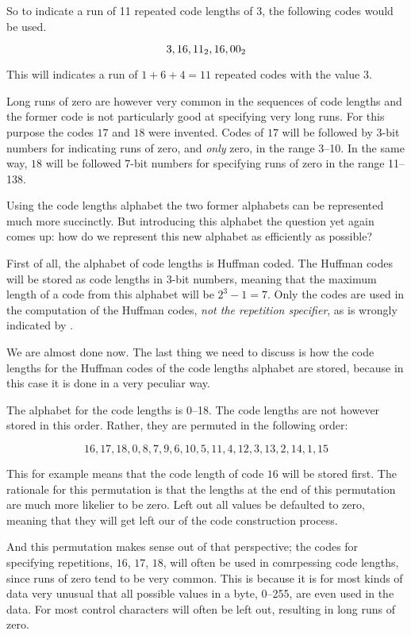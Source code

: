 So to indicate a run of 11 repeated code lengths of $3$, the following
codes would be used.

\begin{equation*}
  3, 16, \mbox{\ensuremath{11_2}}, 16, \mbox{\ensuremath{00_2}}
\end{equation*}

This will indicates a run of $1 + 6 + 4 = 11$ repeated codes with the
value $3$.

Long runs of zero are however very common in the sequences of code
lengths and the former code is not particularly good at specifying
very long runs. For this purpose the codes $17$ and $18$ were
invented. Codes of $17$ will be followed by 3-bit numbers for
indicating runs of zero, and \textit{only} zero, in the range
3--10. In the same way, $18$ will be followed 7-bit numbers for
specifying runs of zero in the range 11--138.

Using the code lengths alphabet the two former alphabets can be
represented much more succinctly. But introducing this alphabet the
question yet again comes up: how do we represent this new alphabet as
efficiently as possible?

First of all, the alphabet of code lengths is Huffman coded. The
Huffman codes will be stored as code lengths in 3-bit numbers, meaning
that the maximum length of a code from this alphabet will be $2^3 - 1
= 7$. Only the codes are used in the computation of the Huffman codes,
\textit{not the repetition specifier}, as is wrongly indicated by
\cite{Salomon:2004:DCC}.

We are almost done now. The last thing we need to discuss is how the
code lengths for the Huffman codes of the code lengths alphabet are
stored, because in this case it is done in a very peculiar way.

The alphabet for the code lengths is 0--18. The code lengths are not
however stored in this order. Rather, they are permuted in the
following order:

\begin{equation*}
  16, 17, 18, 0, 8, 7, 9, 6, 10, 5, 11, 4, 12, 3, 13, 2, 14, 1, 15
\end{equation*}

This for example means that the code length of code $16$ will be
stored first. The rationale for this permutation is that the lengths
at the end of this permutation are much more likelier to be zero. Left
out all values be defaulted to zero, meaning that they will get left
our of the code construction process.

And this permutation makes sense out of that perspective; the codes
for specifying repetitions, $16$, $17$, $18$, will often be used in
comrpessing code lengths, since runs of zero tend to be very
common. This is because it is for most kinds of data very unusual that
all possible values in a byte, 0--255, are even used in the data. For
most control characters will often be left out, resulting in long runs
of zero.

